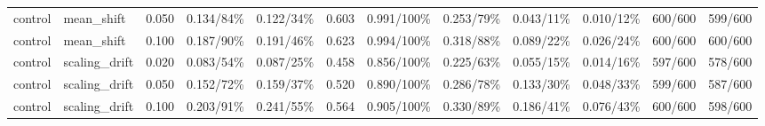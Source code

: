 \begin{table}[!t]
\begin{tabular}{@{}lllrrrrrrrrr@{}}
control & mean\_shift & 0.050 & 0.134/84\% & 0.122/34\% & 0.603 & 0.991/100\% & 0.253/79\% & 0.043/11\% & 0.010/12\% & 600/600 & 599/600 \\
control & mean\_shift & 0.100 & 0.187/90\% & 0.191/46\% & 0.623 & 0.994/100\% & 0.318/88\% & 0.089/22\% & 0.026/24\% & 600/600 & 600/600 \\
control & scaling\_drift & 0.020 & 0.083/54\% & 0.087/25\% & 0.458 & 0.856/100\% & 0.225/63\% & 0.055/15\% & 0.014/16\% & 597/600 & 578/600 \\
control & scaling\_drift & 0.050 & 0.152/72\% & 0.159/37\% & 0.520 & 0.890/100\% & 0.286/78\% & 0.133/30\% & 0.048/33\% & 599/600 & 587/600 \\
control & scaling\_drift & 0.100 & 0.203/91\% & 0.241/55\% & 0.564 & 0.905/100\% & 0.330/89\% & 0.186/41\% & 0.076/43\% & 600/600 & 598/600 \\
\bottomrule
\end{tabular}
\end{table}

